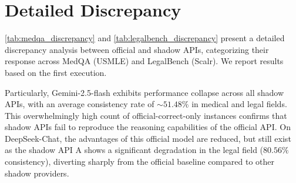 \documentclass[letterpaper,twocolumn,10pt]{article}
\begin{document}
\section{Detailed Discrepancy}
\label{appendix:detailed_discrepancy}

\autoref{tab:medqa_discrepancy} and \autoref{tab:legalbench_discrepancy} present a detailed discrepancy analysis between official and shadow APIs, categorizing their response across MedQA (USMLE) and LegalBench (Scalr). 
We report results based on the first execution.

Particularly, Gemini-2.5-flash exhibits performance collapse across all shadow APIs, with an average consistency rate of $\sim51.48\%$ in medical and legal fields.
This overwhelmingly high count of official-correct-only instances confirms that shadow APIs fail to reproduce the reasoning capabilities of the official API. 
On DeepSeek-Chat, the advantages of this official model are reduced, but still exist as the shadow API A shows a significant degradation in the legal field ($80.56\%$ consistency), diverting sharply from the official baseline compared to other shadow providers.
\end{document}
